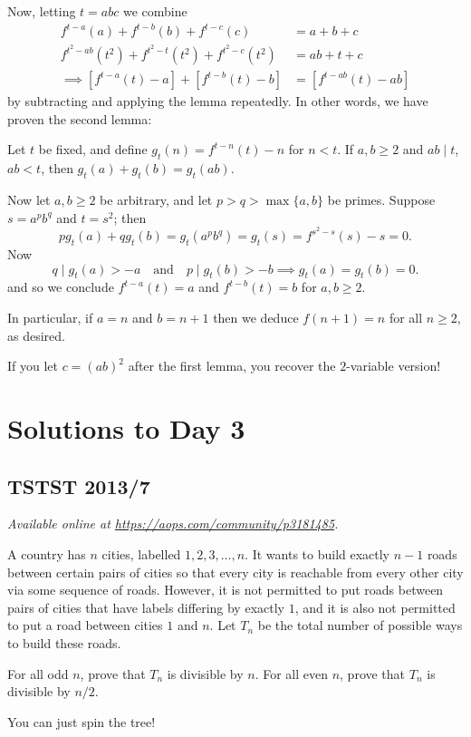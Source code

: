 \documentclass[11pt]{scrartcl}
\begin{document}
Now, letting $t = abc$ we combine
\begin{align*}
 f^{t-a}(a) + f^{t-b}(b) + f^{t-c}(c) &= a+b+c \\
 f^{t^2-ab} (t^2) + f^{t^2-t} (t^2) + f^{t^2-c} (t^2) &= ab + t + c \\
 \implies \left[ f^{t-a}(t) - a \right]
 + \left[ f^{t-b}(t) - b \right]
 &=
 \left[ f^{t-ab}(t) - ab \right]
\end{align*}
by subtracting and applying the lemma repeatedly.
In other words, we have proven the second lemma:
\begin{lemma*}
  Let $t$ be fixed, and define $g_t(n) = f^{t-n}(t) - n$ for $n < t$.
  If $a,b \ge 2$ and $ab \mid t$, $ab < t$,  then $g_t(a) + g_t(b) = g_t(ab)$.
\end{lemma*}

Now let $a,b \ge 2$ be arbitrary, and let $p > q > \max\{a,b\}$ be primes.
Suppose $s = a^p b^q$ and $t = s^2$; then
\[ p g_t(a) + q g_t(b)
  = g_t\left( a^p b^q \right) = g_t(s)
  = f^{s^2-s}(s) - s = 0.  \]
Now \[ q \mid g_t(a) > -a
  \quad\text{and}\quad p \mid g_t(b) > -b
  \implies g_t(a) = g_t(b) = 0.  \]
and so we conclude $f^{t-a}(t) = a$
and $f^{t-b}(t) = b$ for $a,b \ge 2$.

In particular, if $a = n$ and $b = n+1$
then we deduce $f(n+1) = n$ for all $n \ge 2$, as desired.

\begin{remark*}
  If you let $c = (ab)^2$ after the first lemma,
  you recover the $2$-variable version!
\end{remark*}
\pagebreak

\section{Solutions to Day 3}
\subsection{TSTST 2013/7}
\textsl{Available online at \url{https://aops.com/community/p3181485}.}
\begin{mdframed}[style=mdpurplebox,frametitle={Problem statement}]
A country has $n$ cities, labelled $1,2,3,\dots,n$.
It wants to build exactly $n-1$ roads between certain pairs of cities
so that every city is reachable from every other city via some sequence of roads.
However, it is not permitted to put roads between pairs of cities
that have labels differing by exactly $1$,
and it is also not permitted to put a road between cities $1$ and $n$.
Let $T_n$ be the total number of possible ways to build these roads.
\begin{enumerate}[(a)]
  \ii For all odd $n$, prove that $T_n$ is divisible by $n$.
  \ii For all even $n$, prove that $T_n$ is divisible by $n/2$.
\end{enumerate}
\end{mdframed}
You can just spin the tree!
\end{document}
